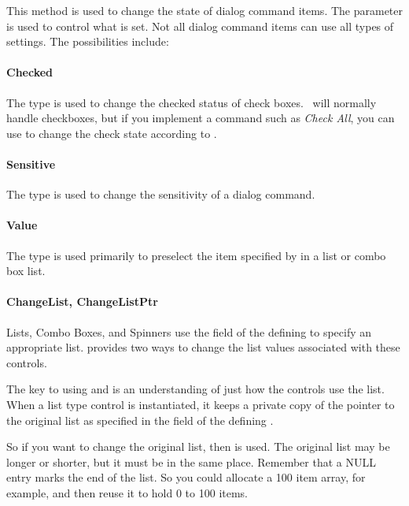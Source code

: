 This method is used to change the state of dialog command items.
The  parameter is used to control what is set.
Not all dialog command items can use all types of settings. The possibilities
include:

\paragraph*{Checked}

The  type is used to change the checked status
of check boxes. \V\ will normally handle checkboxes, but if
you implement a command such as \emph{Check All}, you can
use  to change the check state according to
.

\paragraph*{Sensitive}

The  type is used to change the sensitivity of
a dialog command.

\paragraph*{Value}

The  type is used primarily to preselect the item
specified by  in a list or combo box list.

\paragraph*{ChangeList, ChangeListPtr}

Lists, Combo Boxes, and Spinners use the 
field of the defining  to specify
an appropriate list.  provides two ways
to change the list values associated with these controls.

The key to using  and 
is an understanding of just how the controls use the list.
When a list type control is instantiated, it keeps a private
copy of the pointer to the original list as specified
in the  field of the defining .

So if you want to change the original list, then
 is used. The original list may be
longer or shorter, but it must be in the same place.
Remember that a NULL entry marks the end of the list.
So you could allocate a 100 item array, for example,
and then reuse it to hold 0 to 100 items.

